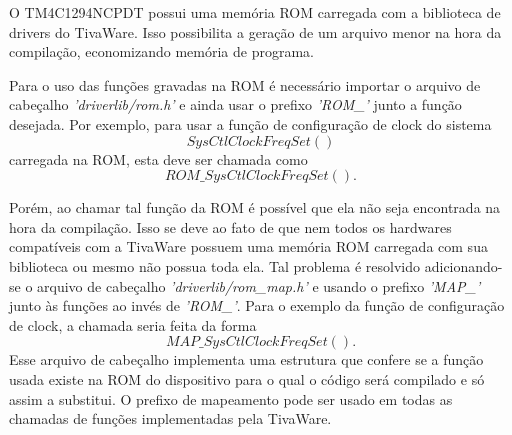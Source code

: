 O TM4C1294NCPDT possui uma memória ROM carregada com a biblioteca de drivers do TivaWare. Isso possibilita a geração de um arquivo menor na hora da compilação, economizando memória de programa.

Para o uso das funções gravadas na ROM é necessário importar o arquivo de cabeçalho \emph{'driverlib/rom.h'} e ainda usar o prefixo \emph{'ROM\_'}  junto a função desejada. Por exemplo, para usar a função de configuração de clock do sistema $$SysCtlClockFreqSet()$$ carregada na ROM, esta deve ser chamada como $$ROM\_SysCtlClockFreqSet().$$

Porém, ao chamar tal função da ROM é possível que ela não seja encontrada na hora da compilação. Isso se deve ao fato de que nem todos os hardwares compatíveis com a TivaWare possuem uma memória ROM carregada com sua biblioteca ou mesmo não possua toda ela.
Tal problema é resolvido adicionando-se o arquivo de cabeçalho \emph{'driverlib/rom\_map.h'} e usando o prefixo \emph{'MAP\_'} junto às funções ao invés de \emph{'ROM\_'}. Para o exemplo da função de configuração de clock, a chamada seria feita da forma  $$MAP\_SysCtlClockFreqSet().$$ Esse arquivo de cabeçalho implementa uma estrutura que confere se a função usada existe na ROM do dispositivo para o qual o código será compilado e só assim a substitui. O prefixo de mapeamento pode ser usado em todas as chamadas de funções implementadas pela TivaWare.
